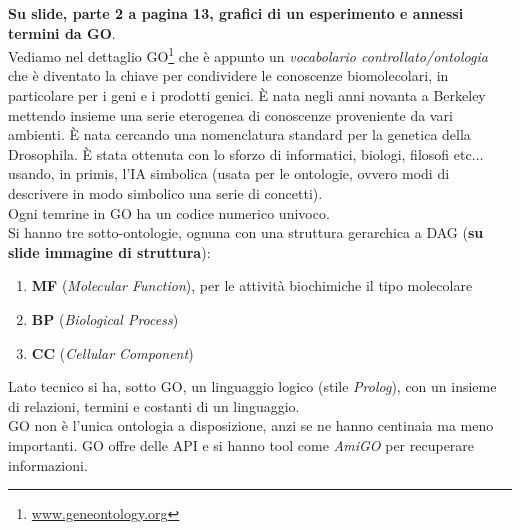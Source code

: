 \documentclass[a4paper,12pt, oneside]{book}
\begin{document}
\textbf{Su slide, parte 2 a pagina 13, grafici di un esperimento e annessi
  termini da GO}.\\  
Vediamo nel dettaglio GO\footnote{\url{www.geneontology.org}}
che è appunto un \textit{vocabolario
  controllato/ontologia} che è diventato la chiave per condividere le conoscenze
biomolecolari, in particolare per i geni e i prodotti genici. È nata negli anni
novanta a Berkeley mettendo insieme una serie eterogenea di conoscenze
proveniente da vari ambienti. È nata cercando una nomenclatura standard per la
genetica della Drosophila. È stata ottenuta con lo sforzo di informatici,
biologi, filosofi etc$\ldots$ usando, in primis, l'IA simbolica (usata per le
ontologie, ovvero modi di descrivere in modo simbolico una serie di concetti).\\
Ogni temrine in GO ha un codice numerico univoco.\\
Si hanno tre sotto-ontologie, ognuna con una struttura gerarchica a DAG
(\textbf{su slide immagine di struttura}):
\begin{enumerate}
  \item \textbf{MF} (\textit{Molecular Function}), per le attività biochimiche
  il tipo molecolare
  \item \textbf{BP} (\textit{Biological Process})
  \item \textbf{CC} (\textit{Cellular Component})
\end{enumerate}
Lato tecnico si ha, sotto GO, un linguaggio logico (stile \textit{Prolog}), con
un insieme di relazioni, termini e costanti di un linguaggio.\\
GO non è l'unica ontologia a disposizione, anzi se ne hanno centinaia ma meno
importanti. GO offre delle API e si hanno tool come \textit{AmiGO} per
recuperare informazioni.
\end{document}
